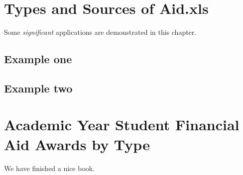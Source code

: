 \documentclass[
]{book}
\begin{document}
\hypertarget{types-and-sources-of-aid.xls}{%
\chapter{Types and Sources of Aid.xls}\label{types-and-sources-of-aid.xls}}

Some \emph{significant} applications are demonstrated in this chapter.

\hypertarget{example-one}{%
\section{Example one}\label{example-one}}

\hypertarget{example-two}{%
\section{Example two}\label{example-two}}

\hypertarget{academic-year-student-financial-aid-awards-by-type}{%
\chapter{Academic Year Student Financial Aid Awards by Type}\label{academic-year-student-financial-aid-awards-by-type}}

We have finished a nice book.

  
\end{document}
